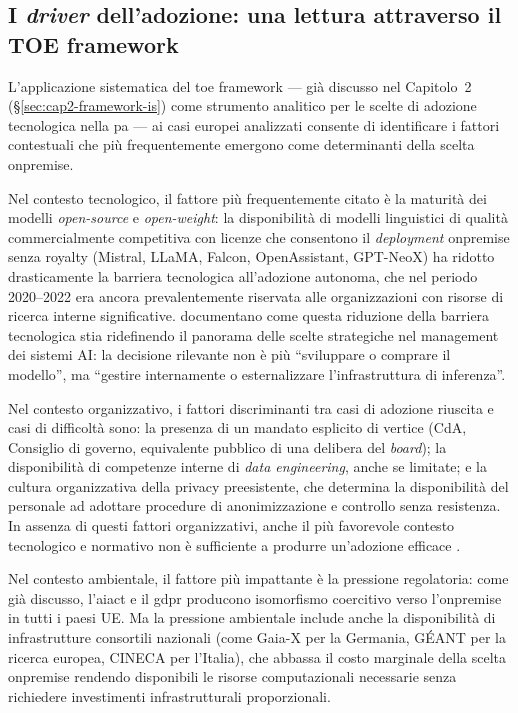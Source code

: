 \subsection{I \textit{driver} dell'adozione: una lettura attraverso il TOE framework}

L'applicazione sistematica del \gls{toe} framework \parencite{TornatzkyFleischer1990}
--- già discusso nel Capitolo~2 (§\ref{sec:cap2-framework-is}) come strumento analitico
per le scelte di adozione tecnologica nella \gls{pa} --- ai casi europei analizzati
consente di identificare i fattori contestuali che più frequentemente emergono
come determinanti della scelta \gls{onpremise}.

Nel contesto tecnologico, il fattore più frequentemente citato è la
maturità dei modelli \textit{open-source} e \textit{open-weight}:
la disponibilità di modelli linguistici di qualità commercialmente competitiva
con licenze che consentono il \textit{deployment} \gls{onpremise} senza royalty
(Mistral, LLaMA, Falcon, OpenAssistant, GPT-NeoX) ha ridotto drasticamente
la barriera tecnologica all'adozione autonoma, che nel periodo 2020--2022 era
ancora prevalentemente riservata alle organizzazioni con risorse di ricerca
interne significative. \textcite{ShresthaAISDM2024} documentano come questa
riduzione della barriera tecnologica stia ridefinendo il panorama delle scelte
strategiche nel management dei sistemi AI: la decisione rilevante non è più
``sviluppare o comprare il modello'', ma ``gestire internamente o esternalizzare
l'infrastruttura di inferenza''.

Nel contesto organizzativo, i fattori discriminanti tra casi di
adozione riuscita e casi di difficoltà sono: la presenza di un mandato
esplicito di vertice (CdA, Consiglio di governo, equivalente pubblico di una
delibera del \textit{board}); la disponibilità di competenze interne
di \textit{data engineering}, anche se limitate; e la cultura
organizzativa della privacy preesistente, che determina la disponibilità del
personale ad adottare procedure di anonimizzazione e controllo senza resistenza.
In assenza di questi fattori organizzativi, anche il più favorevole contesto
tecnologico e normativo non è sufficiente a produrre un'adozione efficace
\parencite{PatalonIsomorphism2024}.

Nel contesto ambientale, il fattore più impattante è la
pressione regolatoria: come già discusso, l'\gls{aiact} e il \gls{gdpr} producono
isomorfismo coercitivo verso l'\gls{onpremise} in tutti i paesi UE. Ma la
pressione ambientale include anche la disponibilità di infrastrutture
consortili nazionali (come Gaia-X per la Germania, GÉANT per la ricerca europea,
CINECA per l'Italia), che abbassa il costo marginale della scelta
\gls{onpremise} rendendo disponibili le risorse computazionali necessarie
senza richiedere investimenti infrastrutturali proporzionali.

